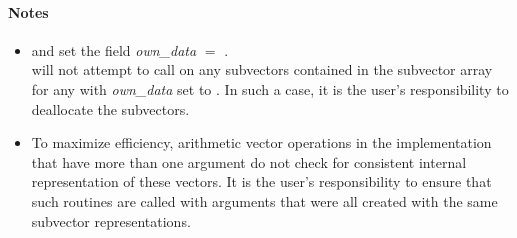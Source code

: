 \paragraph{\bf Notes} 
           
\begin{itemize}
                                        
\item
  {\warn} and  set
  the field {\em own\_data} $=$ .  \\
   will not attempt to call
   on any subvectors contained in the subvector array
  for any  with {\em own\_data} set to . In
  such a case, it is the user's responsibility to deallocate the
  subvectors.

\item
  {\warn}To maximize efficiency, arithmetic vector operations in the
  {\nvecmanyvector} implementation that have more than one
   argument do not check for consistent internal
  representation of these vectors. It is the user's responsibility to
  ensure that such routines are called with  arguments
  that were all created with the same subvector representations.

\end{itemize}

